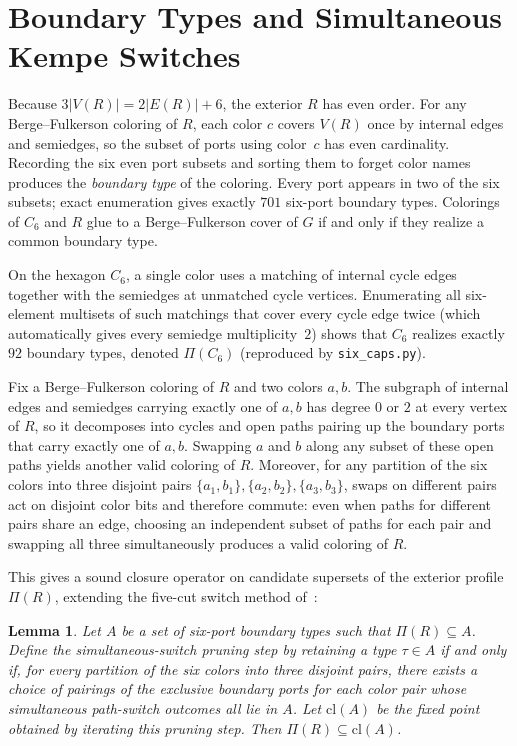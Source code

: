 \documentclass[11pt]{article}
\newtheorem{lemma}[theorem]{Lemma}
\begin{document}
\section{Boundary Types and Simultaneous Kempe Switches}

Because $3|V(R)| = 2|E(R)| + 6$, the exterior $R$ has even order. For any
Berge--Fulkerson coloring of $R$, each color $c$ covers $V(R)$ once by internal edges and
semiedges, so the subset of ports using color~$c$ has even cardinality. Recording the six
even port subsets and sorting them to forget color names produces the \emph{boundary type}
of the coloring. Every port appears in two of the six subsets; exact enumeration gives
exactly $701$ six-port boundary types. Colorings of $C_6$ and $R$ glue to a
Berge--Fulkerson cover of $G$ if and only if they realize a common boundary type.

On the hexagon $C_6$, a single color uses a matching of internal cycle edges together
with the semiedges at unmatched cycle vertices. Enumerating all six-element multisets of
such matchings that cover every cycle edge twice (which automatically gives every
semiedge multiplicity~$2$) shows that $C_6$ realizes exactly $92$ boundary types,
denoted $\Pi(C_6)$ (reproduced by \texttt{six\_caps.py}).

Fix a Berge--Fulkerson coloring of $R$ and two colors $a, b$. The subgraph of internal
edges and semiedges carrying exactly one of $a, b$ has degree $0$ or $2$ at every vertex
of $R$, so it decomposes into cycles and open paths pairing up the boundary ports that
carry exactly one of $a, b$. Swapping $a$ and $b$ along any subset of these open paths
yields another valid coloring of $R$. Moreover, for any partition of the six colors into
three disjoint pairs $\{a_1,b_1\}, \{a_2,b_2\}, \{a_3,b_3\}$, swaps on different pairs
act on disjoint color bits and therefore commute: even when paths for different pairs
share an edge, choosing an independent subset of paths for each pair and swapping all
three simultaneously produces a valid coloring of $R$.

This gives a sound closure operator on candidate supersets of the exterior profile
$\Pi(R)$, extending the five-cut switch method of~\cite{MMT}:

\begin{lemma}\label{lem:closure}
Let $A$ be a set of six-port boundary types such that $\Pi(R) \subseteq A$. Define the
simultaneous-switch pruning step by retaining a type $\tau \in A$ if and only if, for
every partition of the six colors into three disjoint pairs, there exists a choice of
pairings of the exclusive boundary ports for each color pair whose simultaneous
path-switch outcomes all lie in $A$. Let $\mathrm{cl}(A)$ be the fixed point obtained by
iterating this pruning step. Then $\Pi(R) \subseteq \mathrm{cl}(A)$.
\end{lemma}
\end{document}
